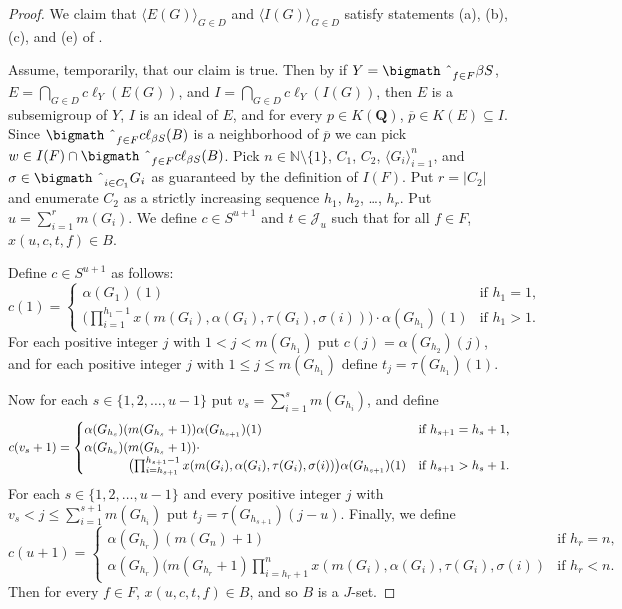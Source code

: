 \documentclass[12pt,showtrims]{memoir}
\theoremstyle{plain}
\theoremstyle{definition}
\newcommand{\la}{\langle}
\newcommand{\ra}{\rangle}
\newcommand{\bbN}{\mathbb{N}}
\newcommand{\calJ}{\mathcal{J}}
\newcommand{\bigtimes}{\hbox{\bigmath \char'2}}
\begin{document}
\begin{proof}
  We claim that $\la E(G) \ra_{G \in D}$ and $\la I(G) \ra_{G \in D}$ satisfy statements (a), (b), (c), and (e) of \cite[Lemma 14.9]{Hindman:1998fk}.

  Assume, temporarily, that our claim is true. 
  Then by \cite[Lemma 14.9]{Hindman:1998fk} if $Y = \bigtimes_{f \in F} \beta S$, $E = \bigcap_{G \in D} c\ell_Y(E(G))$, and $I = \bigcap_{G \in D} c\ell_Y(I(G))$, then $E$ is a subsemigroup of $Y$, $I$ is an ideal of $E$, and for every $p \in K(\mathbf{Q})$, $\overline{p} \in K(E) \subseteq I$. 
  Since $\bigtimes_{f \in F} c\ell_{\beta S} (B)$ is a neighborhood of $\overline{p}$ we can pick $w \in I(F) \cap \bigtimes_{f \in F} c\ell_{\beta S} (B)$. 
  Pick $n \in \bbN\setminus \{1\}$, $C_1$, $C_2$, $\la G_i \ra_{i=1}^n$, and $\sigma \in \bigtimes_{i \in C_1} G_i$ as guaranteed by the definition of $I(F)$. 
  Put $r = |C_2|$ and enumerate $C_2$ as a strictly increasing sequence $h_1$, $h_2$, \dots, $h_r$.
  Put $u = \sum_{i=1}^r m(G_i)$.
  We define $c \in S^{u+1}$ and $t \in \calJ_u$ such that for all $f \in F$, $x(u, c, t, f) \in B$.

  Define $c \in S^{u+1}$ as follows:
  \[
    c(1) = 
    \begin{cases}
      \alpha(G_1)(1) & \mbox{if $h_1 = 1$,} \\
      \bigl(\prod_{i=1}^{h_1-1} x(m(G_i), \alpha(G_i), \tau(G_i), \sigma(i))\bigr) \cdot \alpha(G_{h_1})(1) & \mbox{if $h_1 > 1$.}
    \end{cases}
  \]
  For each positive integer $j$ with $1 < j < m(G_{h_1})$ put $c(j) = \alpha(G_{h_2})(j)$, and for each positive integer $j$ with $1 \le j \le m(G_{h_1})$ define $t_j = \tau(G_{h_1})(1)$. 

  Now for each $s \in \{1, 2, \ldots, u-1\}$ put $v_s = \sum_{i=1}^s m(G_{h_i})$, and define
  \[
    c(v_s+1) = 
    \begin{cases}
      \alpha(G_{h_s})(m(G_{h_s}+1))\alpha(G_{h_{s+1}})(1) & \mbox{if $h_{s+1} = h_s + 1$,} \\

      \alpha(G_{h_s})(m(G_{h_s}+1))\cdot & \\
      \hspace{3.5em}\bigl(\prod_{i=h_{s+1}}^{h_{s+1}-1} x(m(G_i), \alpha(G_i), \tau(G_i), \sigma(i))\bigr)\alpha(G_{h_{s+1}})(1) & \mbox{if $h_{s+1} > h_s+1$.}
    \end{cases}
  \]
  For each $s \in \{1, 2, \ldots, u-1\}$ and every positive integer $j$ with $v_s < j \le \sum_{i=1}^{s+1} m(G_{h_i})$ put $t_j = \tau(G_{h_{s+1}})(j-u)$. 
  Finally, we define
  \[
    c(u+1) = 
    \begin{cases}
      \alpha(G_{h_r})(m(G_n) + 1) & \mbox{if $h_r = n$,} \\
      \alpha(G_{h_r})(m(G_{h_r}+1)\prod_{i=h_r+1}^n x(m(G_i), \alpha(G_i), \tau(G_i), \sigma(i)) & \mbox{if $h_r < n$.}
    \end{cases}
  \]
  Then for every $f \in F$, $x(u, c, t, f) \in B$, and so $B$ is a $J$-set.


\end{proof}
\end{document}
